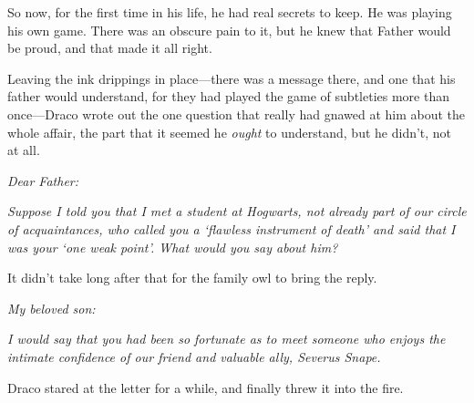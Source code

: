So now, for the first time in his life, he had real secrets to keep. He was 
playing his own game. There was an obscure pain to it, but he knew that Father 
would be proud, and that made it all right.

Leaving the ink drippings in place---there was a message there, and one that 
his father would understand, for they had played the game of subtleties more 
than once---Draco wrote out the one question that really had gnawed at him 
about the whole affair, the part that it seemed he \emph{ought} to understand, 
but he didn't, not at all.

\emph{Dear Father:}

\emph{Suppose I told you that I met a student at Hogwarts, not already part of 
our circle of acquaintances, who called you a `flawless instrument of death' 
and said that I was your `one weak point'. What would you say about him?}

It didn't take long after that for the family owl to bring the reply.

\emph{My beloved son:}

\emph{I would say that you had been so fortunate as to meet someone who enjoys 
the intimate confidence of our friend and valuable ally, Severus Snape.}

Draco stared at the letter for a while, and finally threw it into the fire.
